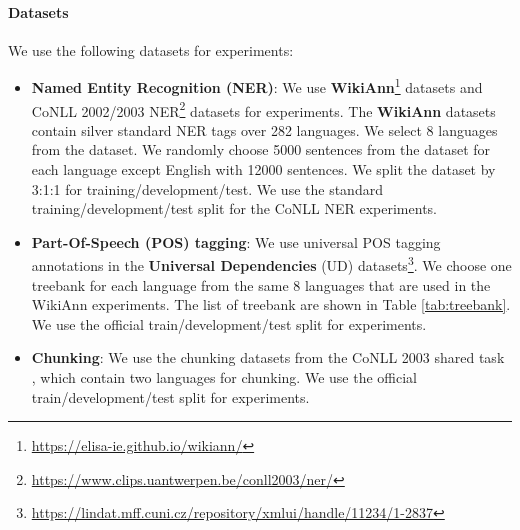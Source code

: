 \documentclass[11pt,a4paper]{article}
\begin{document}
\paragraph{Datasets}
We use the following datasets for experiments:
\begin{itemize}
\item \textbf{Named Entity Recognition (NER)}: We use \textbf{{\bf WikiAnn}}\footnote{\url{https://elisa-ie.github.io/wikiann/}} \cite{pan-etal-2017-cross} datasets and CoNLL 2002/2003 NER\footnote{\url{https://www.clips.uantwerpen.be/conll2003/ner/}} \cite{tjong-kim-sang-2002-introduction,tjong-kim-sang-de-meulder-2003-introduction} datasets  for experiments. The {\bf WikiAnn} datasets contain silver standard NER tags over 282 languages. We select 8 languages from the dataset. We randomly choose 5000 sentences from the dataset for each language except English with 12000 sentences. We split the dataset by 3:1:1 for training/development/test. We use the standard training/development/test split for the CoNLL NER experiments.
    \item \textbf{Part-Of-Speech (POS) tagging}: We use universal POS tagging annotations in the {\bf Universal Dependencies} (UD) \cite{nivre-etal-2016-universal} datasets\footnote{\url{https://lindat.mff.cuni.cz/repository/xmlui/handle/11234/1-2837}}. We choose one treebank for each language from the same 8 languages that are used in the WikiAnn experiments. The list of treebank are shown in Table \ref{tab:treebank}. We use the official train/development/test split for experiments.
    \item \textbf{Chunking}: We use the chunking datasets from the CoNLL 2003 shared task \cite{tjong-kim-sang-de-meulder-2003-introduction}, which contain two languages for chunking. We use the official train/development/test split for experiments.
\end{itemize}
\end{document}
